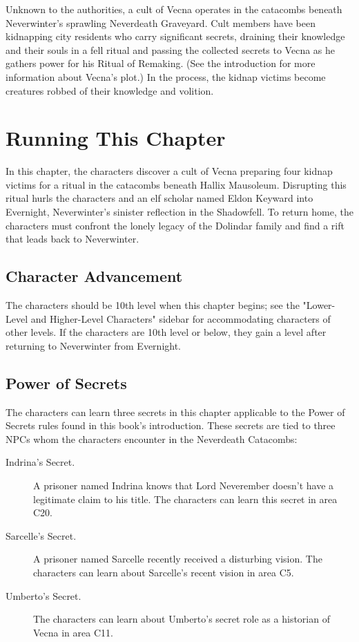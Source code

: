 \documentclass[10pt,a4paper,twoside,bg=print,twocolumn,openany,nodeprecatedcode]{dndbook}
\begin{document}
Unknown to the authorities, a cult of Vecna operates in the catacombs beneath Neverwinter's sprawling Neverdeath Graveyard. Cult members have been kidnapping city residents who carry significant secrets, draining their knowledge and their souls in a fell ritual and passing the collected secrets to Vecna as he gathers power for his Ritual of Remaking. (See the introduction for more information about Vecna's plot.) In the process, the kidnap victims become creatures robbed of their knowledge and volition.

\section{Running This Chapter}
In this chapter, the characters discover a cult of Vecna preparing four kidnap victims for a ritual in the catacombs beneath Hallix Mausoleum. Disrupting this ritual hurls the characters and an elf scholar named Eldon Keyward into Evernight, Neverwinter's sinister reflection in the Shadowfell. To return home, the characters must confront the lonely legacy of the Dolindar family and find a rift that leads back to Neverwinter.

\subsection{Character Advancement}
The characters should be 10th level when this chapter begins; see the "Lower-Level and Higher-Level Characters" sidebar for accommodating characters of other levels. If the characters are 10th level or below, they gain a level after returning to Neverwinter from Evernight.

\subsection{Power of Secrets}
The characters can learn three secrets in this chapter applicable to the Power of Secrets rules found in this book's introduction. These secrets are tied to three NPCs whom the characters encounter in the Neverdeath Catacombs:


\begin{description}
\item[Indrina's Secret.]
A prisoner named Indrina knows that Lord Neverember doesn't have a legitimate claim to his title. The characters can learn this secret in area C20.
\item[Sarcelle's Secret.]
A prisoner named Sarcelle recently received a disturbing vision. The characters can learn about Sarcelle's recent vision in area C5.
\item[Umberto's Secret.]
The characters can learn about Umberto's secret role as a historian of Vecna in area C11.
\end{description}
\end{document}
